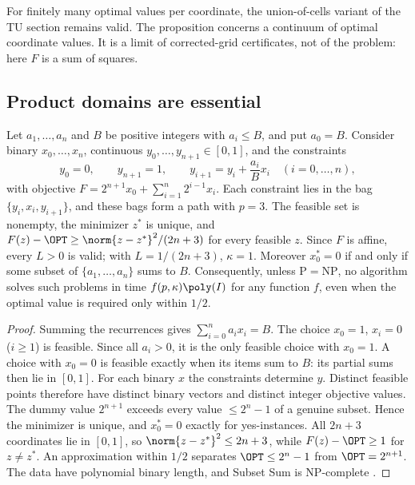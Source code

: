 For finitely many optimal values per coordinate, the union-of-cells variant
of the TU section remains valid. The proposition concerns a continuum of
optimal coordinate values. It is a limit of corrected-grid certificates, not
of the problem: here $F$ is a sum of squares.

\subsection{Product domains are essential}\label{sec:limits-constraints}

\begin{proposition}\label{lim:prop:constraints}
Let $a_1,\ldots,a_n$ and $B$ be positive integers with $a_i\le B$, and put
$a_0=B$. Consider binary $x_0,\ldots,x_n$, continuous
$y_0,\ldots,y_{n+1}\in[0,1]$, and the constraints
\[
y_0=0,\qquad y_{n+1}=1,\qquad y_{i+1}=y_i+\frac{a_i}Bx_i\quad(i=0,\ldots,n),
\]
with objective $F=2^{n+1}x_0+\sum_{i=1}^n2^{i-1}x_i$. Each constraint lies in
the bag $\{y_i,x_i,y_{i+1}\}$, and these bags form a path with $p=3$. The
feasible set is nonempty, the minimizer $z^*$ is unique, and
$F(z)-\OPT\ge\norm{z-z^*}^2/(2n+3)$ for every feasible $z$. Since $F$ is
affine, every $L>0$ is valid; with $L=1/(2n+3)$, $\kappa=1$. Moreover
$x_0^*=0$ if and only if some subset of $\{a_1,\ldots,a_n\}$ sums to $B$.
Consequently, unless $\mathrm P=\mathrm{NP}$, no algorithm solves such
problems in time $f(p,\kappa)\poly(I)$ for any function $f$, even when the
optimal value is required only within $1/2$.
\end{proposition}

\begin{proof}
Summing the recurrences gives $\sum_{i=0}^na_ix_i=B$. The choice $x_0=1$,
$x_i=0$ ($i\ge1$) is feasible. Since all $a_i>0$, it is the only feasible
choice with $x_0=1$. A choice with $x_0=0$ is feasible exactly when its
items sum to $B$: its partial sums then lie in $[0,1]$. For each binary $x$
the constraints determine $y$. Distinct feasible points therefore have
distinct binary vectors and distinct integer objective values. The dummy
value $2^{n+1}$ exceeds every value $\le2^n-1$ of a genuine subset. Hence
the minimizer is unique, and $x_0^*=0$ exactly for yes-instances. All
$2n+3$ coordinates lie in $[0,1]$, so $\norm{z-z^*}^2\le2n+3$, while
$F(z)-\OPT\ge1$ for $z\ne z^*$. An approximation within $1/2$ separates
$\OPT\le2^n-1$ from $\OPT=2^{n+1}$. The data have polynomial binary length,
and Subset Sum is NP-complete \cite{GareyJohnson1979}.
\end{proof}


